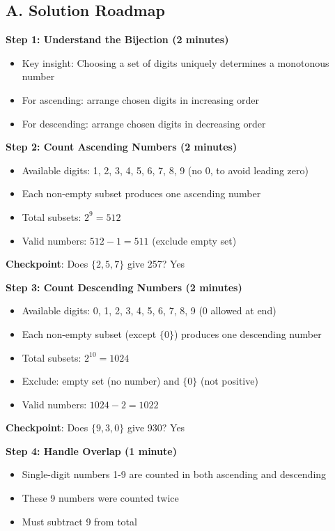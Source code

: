 \documentclass[]{article}
\begin{document}
\begin{solutionbox}
\subsection*{A. Solution Roadmap}

\textbf{Step 1: Understand the Bijection (2 minutes)}
\begin{itemize}
    \item Key insight: Choosing a set of digits uniquely determines a monotonous number
    \item For ascending: arrange chosen digits in increasing order
    \item For descending: arrange chosen digits in decreasing order
\end{itemize}

\textbf{Step 2: Count Ascending Numbers (2 minutes)}
\begin{itemize}
    \item Available digits: 1, 2, 3, 4, 5, 6, 7, 8, 9 (no 0, to avoid leading zero)
    \item Each non-empty subset produces one ascending number
    \item Total subsets: $2^9 = 512$
    \item Valid numbers: $512 - 1 = 511$ (exclude empty set)
\end{itemize}

\textbf{Checkpoint}: Does $\{2,5,7\}$ give 257? Yes \checkmark

\textbf{Step 3: Count Descending Numbers (2 minutes)}
\begin{itemize}
    \item Available digits: 0, 1, 2, 3, 4, 5, 6, 7, 8, 9 (0 allowed at end)
    \item Each non-empty subset (except $\{0\}$) produces one descending number
    \item Total subsets: $2^{10} = 1024$
    \item Exclude: empty set (no number) and $\{0\}$ (not positive)
    \item Valid numbers: $1024 - 2 = 1022$
\end{itemize}

\textbf{Checkpoint}: Does $\{9,3,0\}$ give 930? Yes \checkmark

\textbf{Step 4: Handle Overlap (1 minute)}
\begin{itemize}
    \item Single-digit numbers 1-9 are counted in both ascending and descending
    \item These 9 numbers were counted twice
    \item Must subtract 9 from total
\end{itemize}


\end{solutionbox}
\end{document}
